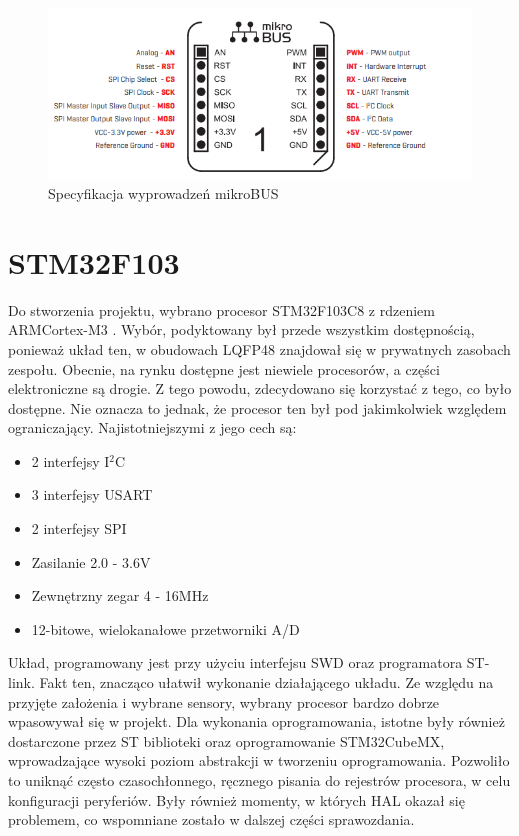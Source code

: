 \begin{figure}[H]
    \centering
    \includegraphics[width=12cm]{Graphics/mikrobus_pinout.png}
    \caption{Specyfikacja wyprowadzeń mikroBUS\texttrademark \cite{mikrobus_specification}}
    \label{img:mikrobus_pinout}
\end{figure}


\section{STM32F103}
Do stworzenia projektu, wybrano procesor STM32F103C8 z rdzeniem ARM\textregistered Cortex\textregistered-M3 \cite{stm_datasheet}. Wybór, podyktowany był przede wszystkim dostępnością, ponieważ układ ten, w obudowach LQFP48 znajdował się w prywatnych zasobach zespołu. Obecnie, na rynku dostępne jest niewiele procesorów, a części elektroniczne są drogie. Z tego powodu, zdecydowano się korzystać z tego, co było dostępne. Nie oznacza to jednak, że procesor ten był pod jakimkolwiek względem ograniczający. Najistotniejszymi z jego cech są:
\begin{itemize}
    \item 2 interfejsy I$^2$C
    \item 3 interfejsy USART
    \item 2 interfejsy SPI
    \item Zasilanie 2.0 - 3.6V
    \item Zewnętrzny zegar 4 - 16MHz
    \item 12-bitowe, wielokanałowe przetworniki A/D
\end{itemize}
Układ, programowany jest przy użyciu interfejsu SWD oraz programatora ST-link. Fakt ten, znacząco ułatwił wykonanie działającego układu. Ze względu na przyjęte założenia i wybrane sensory, wybrany procesor bardzo dobrze wpasowywał się w projekt. Dla wykonania oprogramowania, istotne były również dostarczone przez ST biblioteki oraz oprogramowanie STM32CubeMX, wprowadzające wysoki poziom abstrakcji w tworzeniu oprogramowania. Pozwoliło to uniknąć często czasochłonnego, ręcznego pisania do rejestrów procesora, w celu konfiguracji peryferiów. Były również momenty, w których HAL okazał się problemem, co wspomniane zostało w dalszej części sprawozdania.

